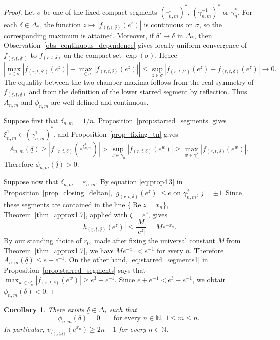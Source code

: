 \documentclass[a4paper, 11pt, reqno]{amsart}
\numberwithin{equation}{section}
\theoremstyle{plain}
\newtheorem{corollary}[theorem]{Corollary}
\theoremstyle{remark}
\newcommand{\N}{{\mathbb{N}}}
\newcommand{\uldelta}{\underline{\delta}}
\newcommand{\ulr}{\underline{r}}
\newcommand{\ult}{\underline{t}}
\newcommand{\Rea}{\operatorname{Re }}
\begin{document}
\begin{proof}
	Let \(\sigma\) be one of the fixed compact segments \((\gamma^1_{n,m})^*\), \((\gamma^{-1}_{n,m})^*\) or \(\gamma_n^*\).  For each \(\uldelta\in\Delta_*\), the function \(z\mapsto |f_{(\ulr,\ult,\uldelta)}(e^z)|\) is continuous on \(\sigma\), so the corresponding maximum is attained.  Moreover, if \(\uldelta'\to\uldelta\) in \(\Delta_*\), then Observation~\ref{obs_continuous_dependence} gives locally uniform convergence of \(f_{(\ulr,\ult,\uldelta')}\) to \(f_{(\ulr,\ult,\uldelta)}\) on the compact set \(\exp(\sigma)\).  Hence
	\[
	\left|\max_{z\in\sigma}|f_{(\ulr,\ult,\uldelta')}(e^z)|-\max_{z\in\sigma}|f_{(\ulr,\ult,\uldelta)}(e^z)|\right|
	\le
	\sup_{z\in\sigma}|f_{(\ulr,\ult,\uldelta')}(e^z)-f_{(\ulr,\ult,\uldelta)}(e^z)|\to0.
	\]
	The equality between the two chamber maxima follows from the real symmetry of \(f_{(\ulr,\ult,\uldelta)}\) and from the definition of the lower starred segment by reflection.  Thus \(A_{n,m}\) and \(\phi_{n,m}\) are well-defined and continuous.
	
	Suppose first that \(\delta_{n,m}=1/n\).  Proposition~\ref{prop:starred_segments} gives \(\xi^1_{n,m}\in(\gamma^1_{n,m})^*\), and Proposition~\ref{prop_fixing_tn} gives
	\[
	A_{n,m}(\uldelta)
	\ge |f_{(\ulr,\ult,\uldelta)}(e^{\xi^1_{n,m}})|
	>
	\sup_{w\in\gamma_n}|f_{(\ulr,\ult,\uldelta)}(e^w)|
	\ge
	\max_{w\in\gamma_n^*}|f_{(\ulr,\ult,\uldelta)}(e^w)|.
	\]
	Therefore \(\phi_{n,m}(\uldelta)>0\).
	
	
	Suppose now that \(\delta_{n,m}=\varepsilon_{n,m}\).   By equation \eqref{eq:prop4.3} in Proposition~\ref{prop_closing_deltan}, \(|g_{(\ulr,\ult,\uldelta)}(e^z)|\le e\) on \(\gamma^j_{n,m}\), \(j=\pm1\).  Since these segments are contained in the
	line \(\{\Rea z=x_n\}\), Theorem~\ref{thm_approx1.7}, applied with
	\(\zeta=e^z\), gives
	\[
	|h_{(\ulr,\ult,\uldelta)}(e^z)|
	\le \frac{M}{|e^z|}
	=
	Me^{-x_n}.
	\]
	By our standing choice of \(r_0\), made after fixing the universal constant
	\(M\) from Theorem~\ref{thm_approx1.7}, we have \(Me^{-x_n}<e^{-1}\) for every
	\(n\). Therefore
	$
	A_{n,m}(\uldelta)\le e+e^{-1}.
	$
	On the other hand, \eqref{eq:starred_segments1} in Proposition~\ref{prop:starred_segments} says that
	$
	\max_{w\in\gamma_n^*}
	|f_{(\ulr,\ult,\uldelta)}(e^w)|
	\ge e^3-e^{-1}.
	$
	Since \(e+e^{-1}<e^3-e^{-1}\), we obtain \(\phi_{n,m}(\uldelta)<0\).
\end{proof}
\begin{corollary}
	\label{cor:full_shooting}
	There exists \(\uldelta\in\Delta_*\) such that
	\begin{equation}\label{eq:final_shooting}
		\phi_{n,m}(\uldelta)=0
		\qquad\text{for every } n\in\N,\ 1\le m\le n.
	\end{equation}
	In particular, $v_{f_{(\ulr,\ult,\uldelta)}}(e^{x_n})\ge 2n+1$ for every  $n\in\N.$
\end{corollary}
\end{document}
